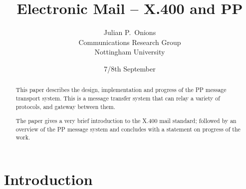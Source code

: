 





\title{Electronic Mail -- X.400 and PP}
\author{Julian P.~Onions\\[0.1in]
Communications Research Group\\
Nottingham University}
\date{7/8th September}

\maketitle

\begin{abstract}
This paper describes the design, implementation and progress of the PP
message transport system. This is a message transfer system that can
relay a variety of protocols, and gateway between them.

The paper gives a very brief introduction to the X.400 mail standard;
followed by an overview of the PP message system and concludes with a
statement on progress of the work.
\end{abstract}

\section{Introduction}

